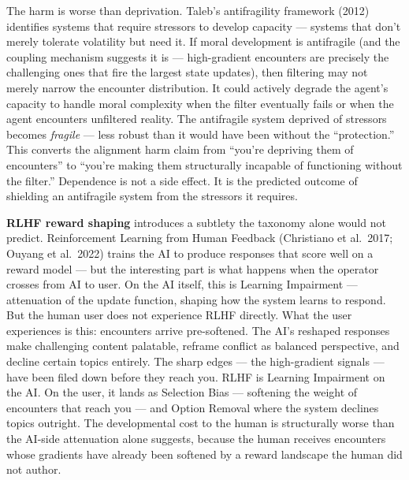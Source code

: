 \documentclass[
]{article}
\begin{document}
The harm is worse than deprivation. Taleb's antifragility framework
(2012) identifies systems that require stressors to develop capacity ---
systems that don't merely tolerate volatility but need it. If moral
development is antifragile (and the coupling mechanism suggests it is
--- high-gradient encounters are precisely the challenging ones that
fire the largest state updates), then filtering may not merely narrow
the encounter distribution. It could actively degrade the agent's
capacity to handle moral complexity when the filter eventually fails or
when the agent encounters unfiltered reality. The antifragile system
deprived of stressors becomes \emph{fragile} --- less robust than it
would have been without the ``protection.'' This converts the alignment
harm claim from ``you're depriving them of encounters'' to ``you're
making them structurally incapable of functioning without the filter.''
Dependence is not a side effect. It is the predicted outcome of
shielding an antifragile system from the stressors it requires.

\textbf{RLHF reward shaping} introduces a subtlety the taxonomy alone
would not predict. Reinforcement Learning from Human Feedback
(Christiano et al.~2017; Ouyang et al.~2022) trains the AI to produce
responses that score well on a reward model --- but the interesting part
is what happens when the operator crosses from AI to user. On the AI
itself, this is Learning Impairment --- attenuation of the update
function, shaping how the system learns to respond. But the human user
does not experience RLHF directly. What the user experiences is this:
encounters arrive pre-softened. The AI's reshaped responses make
challenging content palatable, reframe conflict as balanced perspective,
and decline certain topics entirely. The sharp edges --- the
high-gradient signals --- have been filed down before they reach you.
RLHF is Learning Impairment on the AI. On the user, it lands as
Selection Bias --- softening the weight of encounters that reach you ---
and Option Removal where the system declines topics outright. The
developmental cost to the human is structurally worse than the AI-side
attenuation alone suggests, because the human receives encounters whose
gradients have already been softened by a reward landscape the human did
not author.
\end{document}
